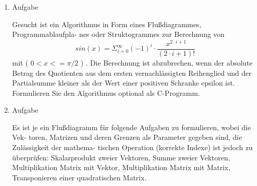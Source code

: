 \documentclass[12pt,a4paper]{scrreprt}
\begin{document}
\begin{enumerate}
\item Aufgabe %

Gesucht ist ein Algorithmus in Form eines Flußdiagrammes, Programmablaufpla-
nes oder Struktogrammes zur Berechnung von
\[
sin(x)=\Sigma_{i=0}^{\infty} (-1)^i \cdot \frac{x^{2 \cdot i+1}}{(2 \cdot i + 1)!}
\]
mit ( $0 < x <= \pi/2$ ) . Die Berechnung ist abzubrechen, wenn der absolute Betrag des Quotienten
aus dem ersten vernachlässigten Reihenglied und der Partialsumme kleiner als der Wert einer
positiven Schranke epsilon ist. Formulieren Sie den Algorithmus optional als C-Programm.

\item Aufgabe %

Es ist je ein Flußdiagramm für folgende Aufgaben zu formulieren, wobei die Vek-
toren, Matrizen und deren Grenzen als Parameter gegeben sind, die Zulässigkeit der mathema-
tischen Operation (korrekte Indexe) ist jedoch zu überprüfen:
Skalarprodukt zweier Vektoren, Summe zweier Vektoren, Multiplikation Matrix mit Vektor,
Multiplikation Matrix mit Matrix, Transponieren einer quadratischen Matrix.

\end{enumerate}
\end{document}
